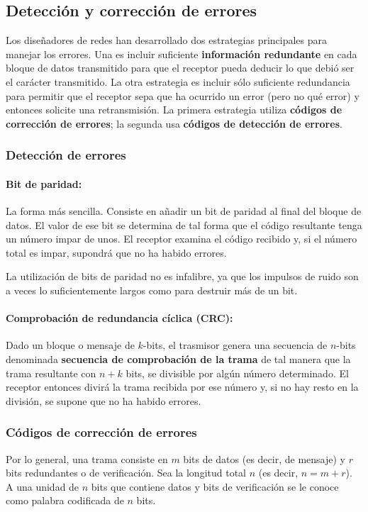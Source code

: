 \subsection{Detección y corrección de errores}

Los diseñadores de redes han desarrollado dos estrategias principales para manejar los errores. Una es incluir suficiente \textbf{información redundante} en cada bloque de datos transmitido para que el receptor pueda deducir lo que debió ser el carácter transmitido. La otra estrategia es incluir sólo suficiente redundancia para permitir que el receptor sepa que ha ocurrido un error (pero no qué error) y entonces solicite una retransmisión. La primera estrategia utiliza \textbf{códigos de corrección de errores}; la segunda usa \textbf{códigos de detección de errores}. 

\subsubsection{Detección de errores}
\paragraph{Bit de paridad:} La forma más sencilla. Consiste en añadir un bit de paridad al final del bloque de datos. El valor de ese bit se determina de tal forma que el código resultante tenga un número impar de unos. El receptor examina el código recibido y, si el número total es impar, supondrá que no ha habido errores. 

La utilización de bits de paridad no es infalibre, ya que los impulsos de ruido son a veces lo suficientemente largos como para destruir más de un bit.

\paragraph{Comprobación de redundancia cíclica (CRC):} Dado un bloque o mensaje de \(k\)-bits, el trasmisor genera una secuencia de \(n\)-bits denominada \textbf{secuencia de comprobación de la trama} de tal manera que la trama resultante con \(n+k\) bits, se divisible por algún número determinado. El receptor entonces divirá la trama recibida por ese número y, si no hay resto en la división, se supone que no ha habido errores.

\subsubsection{Códigos de corrección de errores}
Por lo general, una trama consiste en \(m\) bits de datos (es decir, de mensaje) y \(r\) bits redundantes o de verificación. Sea la longitud total \(n\) (es decir, \(n = m + r\)). A una unidad de \(n\) bits que contiene datos y bits de verificación se le conoce como palabra codificada de \(n\) bits.

